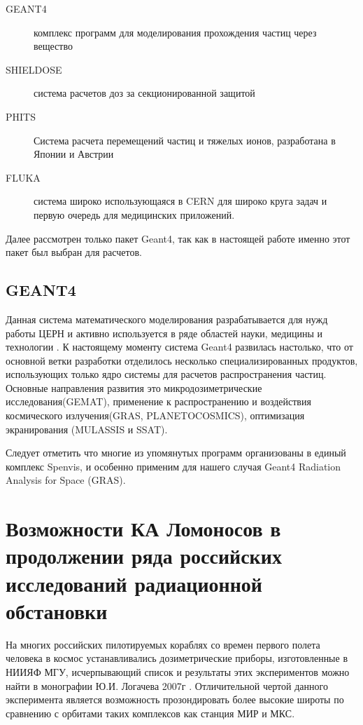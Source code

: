 \begin{description}
	\item[GEANT4] комплекс программ для моделирования прохождения частиц через вещество\cite{Allison2006}
	\item[SHIELDOSE ] система расчетов доз за секционированной защитой \cite{SeltzerS.M.1980}
	\item[PHITS] Система расчета перемещений частиц и тяжелых ионов, 
	разработана в Японии и Австрии%
	\item[FLUKA] система широко использующаяся в CERN для широко круга задач и 
	первую очередь для медицинских приложений\cite{Fasso2003, fluka2014}.
\end{description}

Далее рассмотрен только пакет Geant4, так как в настоящей работе именно этот пакет 
был выбран для расчетов. 


\subsection{GEANT4}

Данная система математического моделирования разрабатывается для нужд работы 
ЦЕРН и активно используется в ряде областей науки, медицины и технологии 
\cite{Agostinelli2003}.
К настоящему моменту система Geant4 развилась настолько, что от основной ветки 
разработки отделилось несколько специализированных продуктов, использующих 
только ядро системы для расчетов распространения частиц. Основные направления 
развития это микродозиметрические исследования(GEMAT), применение к 
распространению и 
воздействия космического излучения(GRAS, PLANETOCOSMICS), оптимизация 
экранирования (MULASSIS \cite{Lei2002} и SSAT). 

Следует отметить что многие из упомянутых программ организованы в единый комплекс Spenvis,
 и особенно применим для нашего случая  Geant4 Radiation Analysis for Space (GRAS).

\section{Возможности КА Ломоносов в продолжении ряда российских исследований радиационной обстановки}

На многих российских пилотируемых кораблях со времен первого полета человека в космос устанавливались дозиметрические приборы, изготовленные в НИИЯФ МГУ, исчерпывающий список и результаты этих экспериментов можно найти в монографии Ю.И. Логачева 2007г \cite{logachev2007}. Отличительной чертой данного эксперимента является возможность прозондировать более высокие широты по сравнению с орбитами таких комплексов как станция МИР и МКС. 

